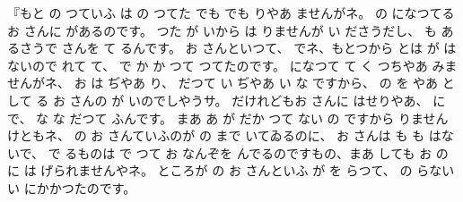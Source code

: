 『もと
の
つていふ
は
の
つてた
でも
でも
りやあ
ませんがネ。
の
になつてる
お
さんに
があるのです。
つた
が
いから
は
りませんが
い
ださうだし、
も
あるさうで
さんを
て
るんです。
お
さんといつて、
でネ、もとつから
とは
が
はないので
れて
て、
で
か
か
つて
つてたのです。
になつて
て
く
つちやあ
みませんがネ、
お
は
ぢやあ
り、
だつて
い
ぢやあ
い
な
ですから、
の
を
やあ
として
る
お
さんの
が
いのでしやうサ。
だけれどもお
さんに
はせりやあ、
に
で、
な
な
だつて
ふんです。
まあ
あ
が
だか
つて
ない
の
ですから
りませんけともネ、
の
お
さんていふのが
の
まで
いてゐるのに、
お
さんは
も
も
はないで、
で
るものは
で
つて
お
なんぞを
んでるのですもの、まあ
しても
お
の
に
は
げられませんやネ。
ところが
の
お
さんといふ
が
を
らつて、
の
らない
い
にかかつたのです。
